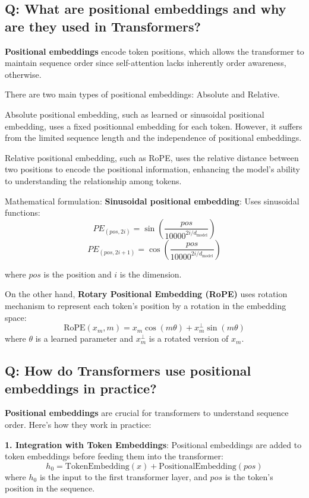 \subsection*{Q: What are positional embeddings and why are they used in Transformers?}
\textbf{Positional embeddings} encode token positions, which allows the transformer to maintain sequence order since self-attention lacks inherently order awareness, otherwise.

There are two main types of positional embeddings: Absolute and Relative.

Absolute positional embedding, such as learned or sinusoidal positional embedding, uses a fixed positionnal embedding for each token. However, it suffers from the limited sequence length and the independence of positional embeddings.

Relative positional embedding, such as RoPE, uses the relative distance between two positions to encode the positional information, enhancing the model's ability to understanding the relationship among tokens.

Mathematical formulation:
\textbf{Sinusoidal positional embedding}: Uses sinusoidal functions:
\[
	PE_{(pos, 2i)} = \sin\left(\frac{pos}{10000^{2i/d_{\text{model}}}}\right)
\]
\[
	PE_{(pos, 2i+1)} = \cos\left(\frac{pos}{10000^{2i/d_{\text{model}}}}\right)
\]

where \(pos\) is the position and \(i\) is the dimension.

On the other hand, \textbf{Rotary Positional Embedding (RoPE)} uses rotation mechanism to represent each token's position by a rotation in the embedding space:
\[
	\text{RoPE}(x_m, m) = x_m \cos(m\theta) + x_m^{\perp} \sin(m\theta)
\]
where \(\theta\) is a learned parameter and \(x_m^{\perp}\) is a rotated version of \(x_m\).


\subsection*{Q: How do Transformers use positional embeddings in practice?}
\textbf{Positional embeddings} are crucial for transformers to understand sequence order. Here's how they work in practice:

\textbf{1. Integration with Token Embeddings}:
Positional embeddings are added to token embeddings before feeding them into the transformer:
\[
	h_0 = \text{TokenEmbedding}(x) + \text{PositionalEmbedding}(pos)
\]
where \(h_0\) is the input to the first transformer layer, and \(pos\) is the token's position in the sequence.

